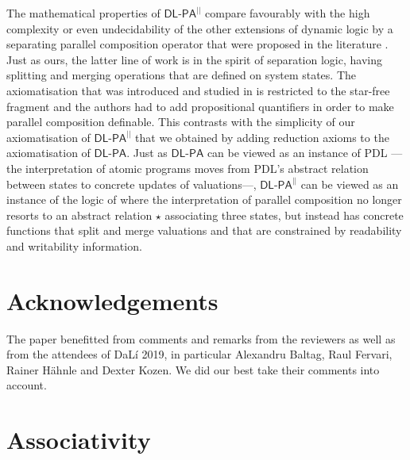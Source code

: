 \documentclass{llncs}
\newcommand{\pll}{ {||} }							%
\newcommand{\Dlpa}{\ensuremath{\mathsf{DL\text{-}PA}}\xspace}
\newcommand{\DlpaPll}{\ensuremath{\mathsf{DL\text{-}PA}^\pll}\xspace}
\begin{document}
The mathematical properties of \DlpaPll compare favourably with 
the high complexity or even undecidability of the 
other extensions of dynamic logic by a separating parallel composition operator that were proposed in the literature
\cite{BalbianiT14,Boudou16}.
Just as ours, the latter line of work is in the spirit of separation logic, having splitting and merging operations that are defined on system states. 
The axiomatisation that was introduced and studied in \cite{DBLP:journals/logcom/BalbianiB18} is restricted to the star-free fragment and the authors had to add propositional quantifiers in order to make parallel composition definable. 
This contrasts with the simplicity of our axiomatisation of \DlpaPll that we obtained by adding reduction axioms to the axiomatisation of \Dlpa. 
Just as \Dlpa can be viewed as an instance of PDL%
---the interpretation of atomic programs moves from PDL's abstract relation between states to concrete updates of valuations\mbox{---,}
\DlpaPll can be viewed as an instance of the logic of \cite{DBLP:journals/entcs/BenevidesFV11}
where the interpretation of parallel composition no longer resorts to
an abstract relation $\star$ associating three states, 
but instead has concrete functions that split and merge valuations and that are constrained by readability and writability information. 

\section{Acknowledgements}
The paper benefitted from comments and remarks from the reviewers as well as from the attendees of DaL\'i 2019, 
in particular Alexandru Baltag, Raul Fervari, Rainer H\"ahnle and Dexter Kozen. 
We did our best take their comments into account. 


\appendix
\section{Associativity}


%


\end{document}
